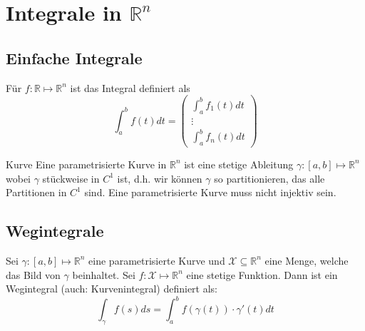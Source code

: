 \documentclass[a4paper,10pt]{article}
\def\R{\mathbb{R}}
\def\X{\mathcal{X}}
\begin{document}
\section{Integrale in \texorpdfstring{\(\R^n\)}{Rⁿ}}
\subsection{Einfache Integrale}
Für \(f: \R \mapsto \R^n\) ist das Integral definiert als
\[\int_a^b f(t)dt = 
\begin{pmatrix*}
  \int_a^b f_1(t) dt \\
  \vdots\\
  \int_a^b f_n(t) dt
\end{pmatrix*}
\]

\begin{mainbox}{Kurve}
  Eine parametrisierte Kurve in \(\R^n\) ist eine stetige Ableitung \(\gamma: \left[a,b\right] \mapsto \R^n\) wobei \(\gamma\) stückweise in \(C^1\) ist, d.h. wir können \(\gamma\) so partitionieren, das alle Partitionen in \(C^1\) sind. Eine parametrisierte Kurve muss nicht injektiv sein.
\end{mainbox}
\subsection{Wegintegrale}
Sei \(\gamma : \left[a,b\right] \mapsto \R^n\) eine parametrisierte Kurve und \(\X \subseteq \R^n\) eine Menge, welche das Bild von \(\gamma\) beinhaltet. Sei \(f : \X \mapsto \R^n\) eine stetige Funktion. Dann ist ein Wegintegral (auch: Kurvenintegral) definiert als:
\[\int_\gamma f(s) ds = \int_a^b f(\gamma(t)) \cdot \gamma'(t) dt\]
\end{document}
